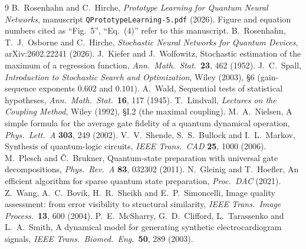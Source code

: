 \documentclass[11pt,a4paper]{article}
\begin{document}
\appendix



\begin{thebibliography}{9}
 B.~Rosenhahn and C.~Hirche, \emph{Prototype Learning for Quantum Neural
Networks}, manuscript \texttt{QPrototypeLearning-5.pdf} (2026).  Figure and equation numbers
cited as ``Fig.~5'', ``Eq.~(4)'' refer to this manuscript.
 B.~Rosenhahn, T.~J.~Osborne and C.~Hirche, \emph{Stochastic Neural Networks for
Quantum Devices}, arXiv:2602.22241 (2026).
 J.~Kiefer and J.~Wolfowitz, Stochastic estimation of the maximum of a regression
function, \emph{Ann.\ Math.\ Stat.}\ \textbf{23}, 462 (1952).
 J.~C.~Spall, \emph{Introduction to Stochastic Search and Optimization}, Wiley
(2003), \S6 (gain-sequence exponents $0.602$ and $0.101$).
 A.~Wald, Sequential tests of statistical hypotheses, \emph{Ann.\ Math.\ Stat.}\
\textbf{16}, 117 (1945).
 T.~Lindvall, \emph{Lectures on the Coupling Method}, Wiley (1992), \S I.2
(the maximal coupling).
 M.~A.~Nielsen, A simple formula for the average gate fidelity of a quantum
dynamical operation, \emph{Phys.\ Lett.\ A} \textbf{303}, 249 (2002).
\bibitem{sbm} V.~V.~Shende, S.~S.~Bullock and I.~L.~Markov, Synthesis of quantum-logic circuits,
\emph{IEEE Trans.\ CAD} \textbf{25}, 1000 (2006).
 M.~Plesch and \v{C}.~Brukner, Quantum-state preparation with universal gate
decompositions, \emph{Phys.\ Rev.\ A} \textbf{83}, 032302 (2011).
\bibitem{gleinig} N.~Gleinig and T.~Hoefler, An efficient algorithm for sparse quantum state
preparation, \emph{Proc.\ DAC} (2021).
 Z.~Wang, A.~C.~Bovik, H.~R.~Sheikh and E.~P.~Simoncelli, Image quality assessment:
from error visibility to structural similarity, \emph{IEEE Trans.\ Image Process.}\ \textbf{13},
600 (2004).
 P.~E.~McSharry, G.~D.~Clifford, L.~Tarassenko and L.~A.~Smith, A dynamical
model for generating synthetic electrocardiogram signals, \emph{IEEE Trans.\ Biomed.\ Eng.}\
\textbf{50}, 289 (2003).
\end{thebibliography}
\end{document}
